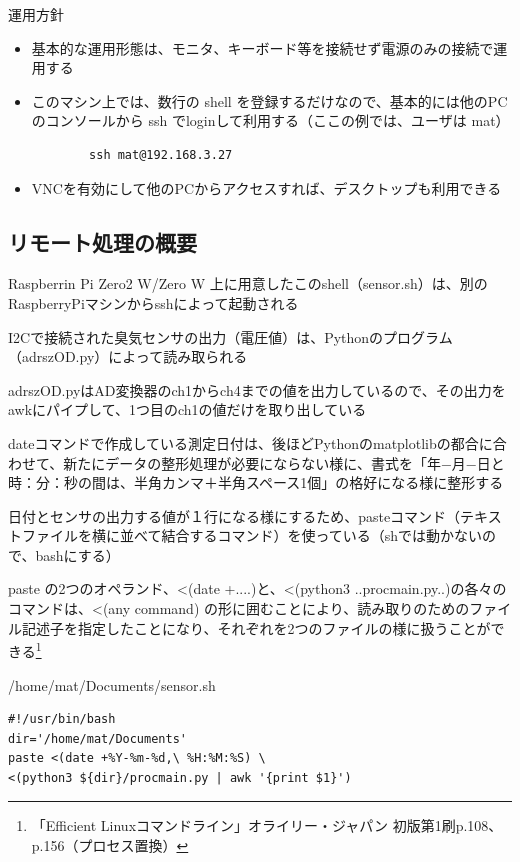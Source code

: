 \documentclass[12pt,a4j]{jsbook}
\begin{document}
運用方針

\begin{itemize}
	\item 基本的な運用形態は、モニタ、キーボード等を接続せず電源のみの接続で運用する
	\item このマシン上では、数行の shell を登録するだけなので、基本的には他のPCのコンソールから ssh でloginして利用する（ここの例では、ユーザは mat）
\begin{spacing}{0.8}
\begin{verbatim}
		ssh mat@192.168.3.27
\end{verbatim}
\end{spacing}
	\item VNCを有効にして他のPCからアクセスすれば、デスクトップも利用できる
\end{itemize}

\subsection{リモート処理の概要}

	Raspberrin Pi Zero2 W/Zero W  上に用意したこのshell（sensor.sh）は、別のRaspberryPiマシンからsshによって起動される

	I2Cで接続された臭気センサの出力（電圧値）は、Pythonのプログラム（adrszOD.py）によって読み取られる

	adrszOD.pyはAD変換器のch1からch4までの値を出力しているので、その出力をawkにパイプして、1つ目のch1の値だけを取り出している

	dateコマンドで作成している測定日付は、後ほどPythonのmatplotlibの都合に合わせて、新たにデータの整形処理が必要にならない様に、書式を「年−月−日と時：分：秒の間は、半角カンマ＋半角スペース1個」の格好になる様に整形する

	日付とセンサの出力する値が１行になる様にするため、pasteコマンド（テキストファイルを横に並べて結合するコマンド）を使っている\footnotemark[1]（shでは動かないので、bashにする）

	paste の2つのオペランド、<(date +....)と、<(python3 ..procmain.py..)の各々のコマンドは、<(any command) の形に囲むことにより、読み取りのためのファイル記述子を指定したことになり、それぞれを2つのファイルの様に扱うことができる\footnote[1]{「Efficient Linuxコマンドライン」オライリー・ジャパン 初版第1刷p.108、p.156（プロセス置換）}

\begin{spacing}{0.95}
\begin{itembox}[l]{/home/mat/Documents/sensor.sh}
\begin{verbatim}
#!/usr/bin/bash
dir='/home/mat/Documents'
paste <(date +%Y-%m-%d,\ %H:%M:%S) \
<(python3 ${dir}/procmain.py | awk '{print $1}')
\end{verbatim}
\end{itembox}
\end{spacing}
\end{document}
